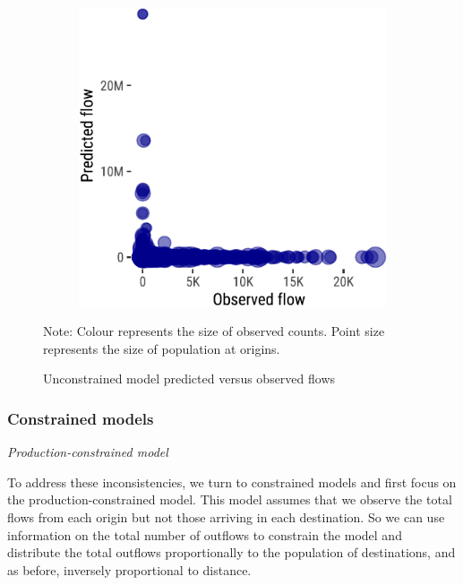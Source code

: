 \documentclass[
  a4paper, 
  twoside,
  final
]{article}
\begin{document}
\begin{figure}
{\begin{figure}[H]
{\centering \includegraphics{region-quarto-template_files/figure-pdf/unnamed-chunk-4-1.pdf}

}

\end{figure}

Note: Colour represents the size of observed counts. Point size
represents the size of population at origins.

}

\caption{\label{fig-1}Unconstrained model predicted versus observed
flows}

\end{figure}

\hypertarget{constrained-models}{%
\subsubsection{Constrained models}\label{constrained-models}}

\emph{Production-constrained model}

To address these inconsistencies, we turn to constrained models and
first focus on the production-constrained model. This model assumes that
we observe the total flows from each origin but not those arriving in
each destination. So we can use information on the total number of
outflows to constrain the model and distribute the total outflows
proportionally to the population of destinations, and as before,
inversely proportional to distance.
\end{document}
